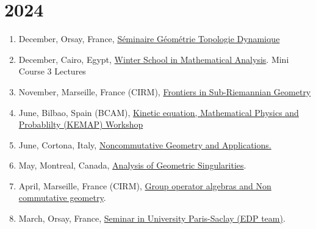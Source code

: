 \documentclass[a4paper, 13pt]{article}
\begin{document}
\section*{2024}
\begin{enumerate}
\item December, Orsay, France, \href{https://www.imo.universite-paris-saclay.fr/fr/events/7496}{Séminaire Géométrie Topologie Dynamique}
\item December, Cairo, Egypt, \href{https://sites.google.com/view/cairowinterschoolinanalysis/home}{Winter School in Mathematical Analysis}. Mini Course 3 Lectures
\item November, Marseille, France (CIRM), \href{https://conferences.cirm-math.fr/3091.html}{Frontiers in Sub-Riemannian Geometry}
\item June, Bilbao, Spain (BCAM), \href{https://www.bcamath.org/en/kinetic-equation-mathematical-physics-and-probablilty-kemap-workshop}{Kinetic equation, Mathematical Physics and Probablilty (KEMAP) Workshop}
\item June, Cortona, Italy, \href{https://sites.google.com/view/ncg2024cortona}{Noncommutative Geometry and Applications.}
\item May, Montreal, Canada, \href{https://www.crmath.ca/en/activities/#/type/activity/id/3895}{Analysis of Geometric Singularities}.
\item April, Marseille, France (CIRM), \href{https://conferences.cirm-math.fr/2987.html}{Group operator algebras and Non commutative geometry}.
\item March, Orsay, France, \href{https://www.imo.universite-paris-saclay.fr/fr/events/7287}{Seminar in University Paris-Saclay (EDP team)}.
\end{enumerate}
\end{document}
